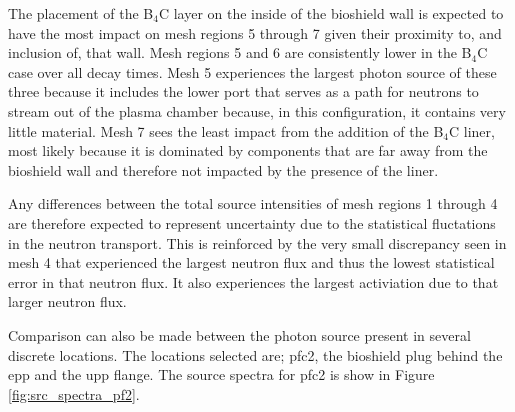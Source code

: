 \documentclass[12pt]{article}
\begin{document}
The placement of the B$_4$C layer on the inside of the bioshield wall is
expected to have the most impact on mesh regions 5 through 7 given their
proximity to, and inclusion of, that wall.  Mesh regions 5 and 6 are
consistently lower in the B$_4$C case over all decay times.  Mesh 5
experiences the largest photon source of these three because it includes the
lower port that serves as a path for neutrons to stream out of the plasma
chamber because, in this configuration, it contains very little material.
Mesh 7 sees the least impact from the addition of the B$_4$C liner, most
likely because it is dominated by components that are far away from the
bioshield wall and therefore not impacted by the presence of the liner.

Any differences between the total source intensities of mesh regions 1 through
4 are therefore expected to represent uncertainty due to the statistical
fluctations in the neutron transport.  This is reinforced by the very small
discrepancy seen in mesh 4 that experienced the largest neutron flux and thus
the lowest statistical error in that neutron flux.  It also experiences the
largest activiation due to that larger neutron flux.

Comparison can also be made between the photon source present in several discrete locations. 
The locations selected are; \gls{pfc}2, the bioshield plug behind the \gls{epp} and
the \gls{upp} flange. The source spectra for \gls{pfc}2 is show in Figure \ref{fig:src_spectra_pf2}.
\end{document}
